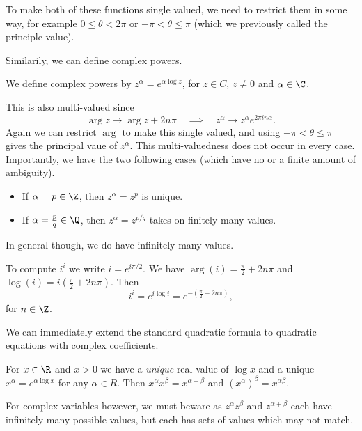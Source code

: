 \documentclass[a4]{scrreprt}
\begin{document}
To make both of these functions single valued, we need to restrict them in some way, for example $0 \leq \theta < 2 \pi$ or $- \pi < \theta \leq \pi$ (which we previously called the principle value).

Similarily, we can define complex powers.

\begin{definition}
	We define complex powers by $z^\alpha = e^{\alpha \log z}$, for $z \in C$, $z \neq 0$ and $\alpha \in \C$.
\end{definition}

This is also multi-valued since
$$
\arg z \rightarrow \arg z + 2n \pi \quad \implies \quad z^\alpha \rightarrow z^\alpha e^{2 \pi i n \alpha}.
$$
Again we can restrict $\arg$ to make this single valued, and using $- \pi < \theta \leq \pi$ gives the principal vaue of $z^\alpha$. This multi-valuedness does not occur in every case. Importantly, we have the two following cases (which have no or a finite amount of ambiguity).
\begin{itemize}
	\item If $\alpha = p \in \Z$, then $z^\alpha = z^p$ is unique.
	\item If $\alpha = \frac{p}{q} \in \Q$, then $z^\alpha = z^{p / q}$ takes on finitely many values. 
\end{itemize}
In general though, we do have infinitely many values.

\begin{example}
	To compute $i^i$ we write $i = e^{i \pi/2}$. We have $\arg(i) = \frac{\pi}{2} + 2n \pi$ and $\log(i) = i\left(\frac{\pi}{2} + 2n \pi\right)$. Then
	$$
i^i = e^{i \log i} = e^{-\left(\frac{\pi}{2} + 2n \pi\right)},
	$$
	for $n \in \Z$.
\end{example}

\begin{remark}
	We can immediately extend the standard quadratic formula to quadratic equations with complex coefficients.
\end{remark}

\begin{remark}
	For $x\in\R$ and $x > 0$ we have a \emph{unique} real value of $\log x$ and a unique $x^\alpha = e^{\alpha \log x}$ for any $\alpha \in R$. Then $x^{\alpha} x^{\beta} = x^{\alpha + \beta}$ and $(x^\alpha)^\beta = x^{\alpha \beta}$.
	
	For complex variables however, we must beware as $z^{\alpha} z^{\beta}$ and $z^{\alpha + \beta}$ each have infinitely many possible values, but each has sets of values which may not match.
\end{remark}
\end{document}
